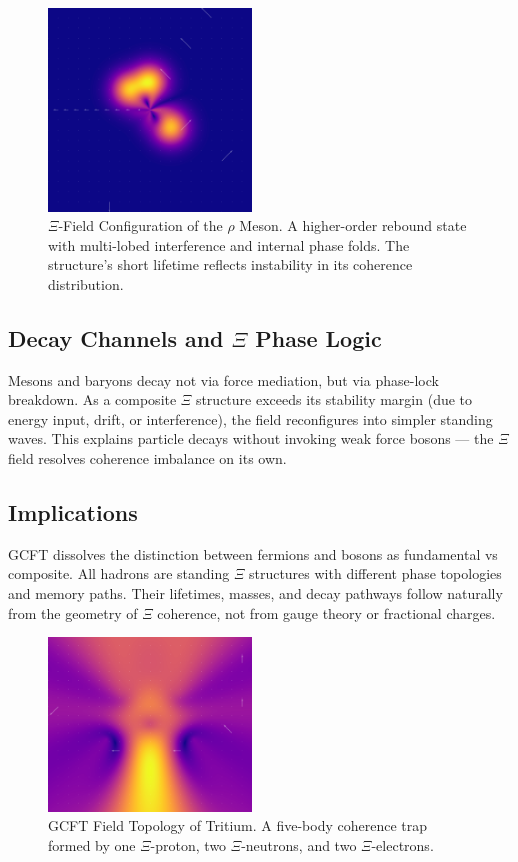 \begin{figure}[ht]
\centering
\includegraphics[width=0.48\textwidth]{figures/xi_rho_field_overlay.png}
\caption{$\Xi$-Field Configuration of the $\rho$ Meson. A higher-order rebound state with multi-lobed interference and internal phase folds. The structure’s short lifetime reflects instability in its coherence distribution.}
\label{fig:rho_field}
\end{figure}

\subsection{\texorpdfstring{Decay Channels and $\Xi$ Phase Logic}{Decay Channels and Xi Phase Logic}}

Mesons and baryons decay not via force mediation, but via phase-lock breakdown. As a composite $\Xi$ structure exceeds its stability margin (due to energy input, drift, or interference), the field reconfigures into simpler standing waves. This explains particle decays without invoking weak force bosons — the $\Xi$ field resolves coherence imbalance on its own.

\subsection{Implications}

GCFT dissolves the distinction between fermions and bosons as fundamental vs composite. All hadrons are standing $\Xi$ structures with different phase topologies and memory paths. Their lifetimes, masses, and decay pathways follow naturally from the geometry of $\Xi$ coherence, not from gauge theory or fractional charges.

\begin{figure}[ht]
\centering
\includegraphics[width=0.48\textwidth]{figures/tritium_modulus_vector_overlay.png}
\caption{GCFT Field Topology of Tritium. A five-body coherence trap formed by one $\Xi$-proton, two $\Xi$-neutrons, and two $\Xi$-electrons.}
\label{fig:tritium_field}
\end{figure}

